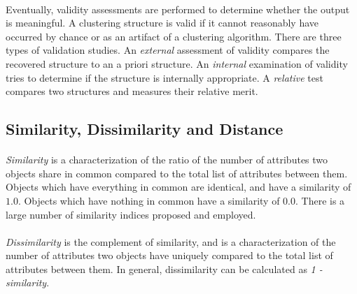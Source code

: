 \documentclass[10pt]{article}\usepackage[]{graphicx}\usepackage[]{color}
\begin{document}
\paragraph{}
Eventually, validity assessments are performed to determine
whether the output is meaningful. A clustering structure is valid if it cannot
reasonably have occurred by chance or as an artifact of a clustering algorithm.
There are three types of validation studies. An \textit{external} assessment of 
validity compares the recovered structure to an a priori structure. 
An \textit{internal} examination of validity tries to determine if the
structure is internally appropriate. A \textit{relative} test compares two
structures and measures their relative merit.

\subsection{Similarity, Dissimilarity and Distance}
\paragraph{}
\textit{Similarity} is a characterization of the ratio of the number of attributes two 
objects share in common compared to the total list of attributes between them. 
Objects which have everything in common are identical, and have a similarity of 
$1.0$. Objects which have nothing in common have a similarity of $0.0$. 
There is a large number of similarity indices proposed and employed.
\paragraph{}
\textit{Dissimilarity} is the complement of similarity, and is a 
characterization of the number of attributes two objects have uniquely 
compared to the total list of attributes between them. 
In general, dissimilarity can be calculated as \textit{1 - similarity}.
\end{document}
